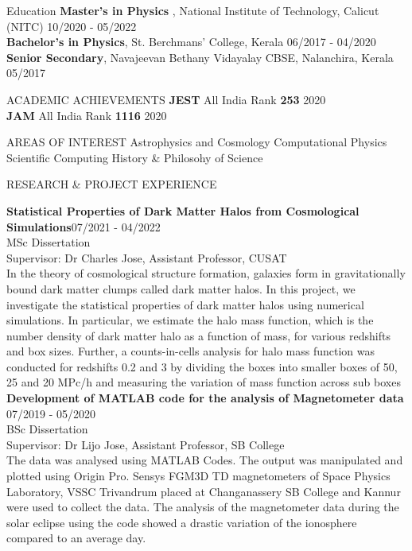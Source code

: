 \documentclass{resume} %
\begin{document}
\begin{rSection}{Education}
{\bf Master's in Physics }, National Institute of Technology, Calicut (NITC) \hfill {10/2020 - 05/2022} \\
{\bf Bachelor’s in Physics}, St. Berchmans’ College, Kerala \hfill {06/2017 - 04/2020}\\
{\bf Senior Secondary}, Navajeevan Bethany Vidayalay CBSE, Nalanchira, Kerala \hfill {05/2017}
\end{rSection}

\begin{rSection}{ACADEMIC ACHIEVEMENTS}
\textbf{JEST} All India Rank \textbf{253} \hfill 2020 \\
\textbf{JAM} All India Rank \textbf{1116} \hfill 2020

\end{rSection}

\begin{rSection}{AREAS OF INTEREST }
Astrophysics and Cosmology \textbar{} Computational Physics  \textbar{} Scientific Computing \textbar{} History \& Philosohy of Science
\end{rSection}

\begin{rSection}{RESEARCH \& PROJECT EXPERIENCE}


\textbf {Statistical Properties of Dark Matter Halos from Cosmological Simulations}\hfill 07/2021 - 04/2022 \\ 
MSc Dissertation \\
Supervisor: Dr Charles Jose, Assistant Professor, CUSAT \\
In the theory of cosmological structure formation, galaxies form in gravitationally
bound dark matter clumps called dark matter halos. In this project, we investigate
the statistical properties of dark matter halos using numerical simulations. In
particular, we estimate the halo mass function, which is the number density of dark
matter halo as a function of mass, for various redshifts and box sizes. Further, a
counts-in-cells analysis for halo mass function was conducted for redshifts 0.2 and
3 by dividing the boxes into smaller boxes of 50, 25 and 20 MPc/h and measuring
the variation of mass function across sub boxes\\


\textbf {Development of MATLAB code for the analysis of Magnetometer data}  \hfill 07/2019 - 05/2020 \\ 
BSc Dissertation\\
Supervisor: Dr Lijo Jose, Assistant Professor, SB College \\ 
The data was analysed using MATLAB Codes. The output was manipulated and plotted using Origin Pro. Sensys FGM3D TD magnetometers of Space Physics Laboratory, VSSC Trivandrum placed at Changanassery SB College and Kannur were used to collect the data. The analysis of the magnetometer data during the solar eclipse using the code showed a drastic variation of the ionosphere compared to an average day. 
\end{rSection} 
\end{document}
